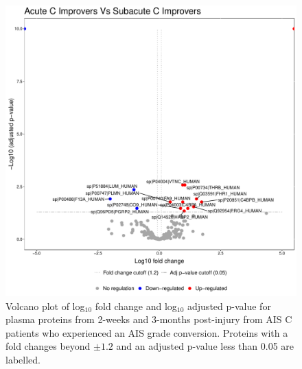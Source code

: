 \documentclass[9pt,lineno]{elife}
\begin{document}
\begin{landscape}
\begin{landscape}
\begin{landscape}
\begin{landscape}
\begin{figure}
\includegraphics[width=1\linewidth]{figures/openms_protein_quantification/label_free/volcano_plots/openms_volcano_plot_2021-08-10_0011} \caption{Volcano plot of log\(_10\) fold change and log\(_10\) adjusted p-value for plasma proteins from 2-weeks and 3-months post-injury from AIS C patients who experienced an AIS grade conversion. Proteins with a fold changes beyond \(\pm 1.2\) and an adjusted p-value less than 0.05 are labelled.}\label{fig:volc-plot-acute-c-imp-vs-subacute-imp}
\end{figure}




\end{landscape}
\end{landscape}
\end{landscape}
\end{landscape}
\end{document}
